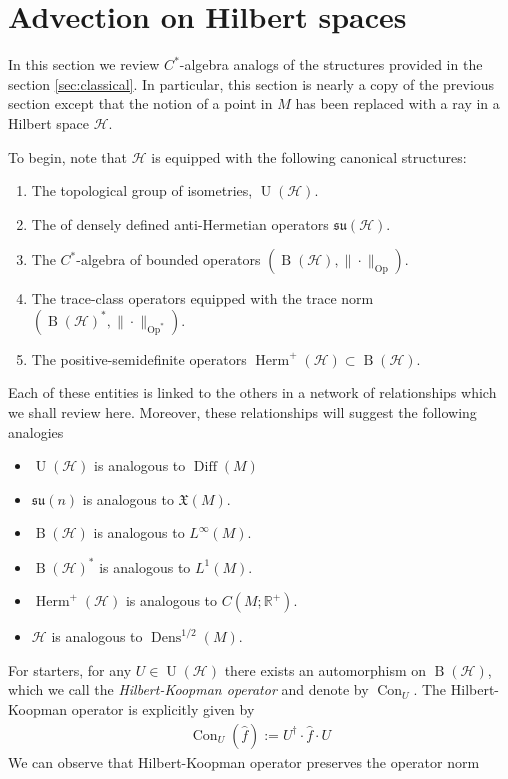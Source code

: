 \documentclass[12pt]{amsart}
\newcommand{\R}{\ensuremath{\mathbb{R}}}
\renewcommand{\H}{\ensuremath{\mathcal{H}}}
\DeclareMathOperator{\Diff}{Diff}
\DeclareMathOperator{\Dens}{Dens}
\DeclareMathOperator{\U}{U}
\DeclareMathOperator{\B}{B}
\DeclareMathOperator{\Herm}{Herm}
\DeclareMathOperator{\Op}{Op}
\DeclareMathOperator{\Con}{Con}
\begin{document}
\section{Advection on Hilbert spaces}
\label{sec:Hilbert}
In this section we review $C^*$-algebra analogs of the structures provided in the section \ref{sec:classical}.
In particular, this section is nearly a copy of the previous section except that the notion of a point in $M$ has been replaced with a ray in a Hilbert space $\mathcal{H}$.

To begin, note that $\H$ is equipped with the following canonical structures:
\begin{enumerate}
	\item The topological group of isometries, $\U(\H)$.
	\item The of densely defined anti-Hermetian operators $\mathfrak{su}(\H)$.
	\item The $C^*$-algebra of bounded operators $( \B(\H) , \| \cdot \|_{\Op})$.
	\item The trace-class operators equipped with the trace norm $(\B(\H)^*,\| \cdot \|_{\Op^*})$.
	\item The positive-semidefinite operators $\Herm^+(\H) \subset \B(\H)$.
\end{enumerate}
Each of these entities is linked to the others in a network of relationships
which we shall review here.
Moreover, these relationships will suggest the following analogies
\begin{itemize}
	\item $\U(\H)$ is analogous to $\Diff(M)$
	\item $\mathfrak{su}(n)$ is analogous to $\mathfrak{X}(M)$.
	\item $\B(\H)$ is analogous to $L^\infty(M)$.
	\item $\B(\H)^*$ is analogous to $L^1(M)$.
	\item $\Herm^+(\H)$ is analogous to $C(M;\R^+)$.
	\item $\H$ is analogous to $\Dens^{1/2}(M)$.
\end{itemize}
For starters, for any $U \in \U(\H)$ there exists an automorphism on $\B(\H)$, which we call the \emph{Hilbert-Koopman operator} and denote by $\Con_U$.
The Hilbert-Koopman operator is explicitly given by
\begin{align*}
	\Con_U( \hat{f} ) := U^\dagger \cdot \hat{f} \cdot U
\end{align*}
We can observe that Hilbert-Koopman operator preserves the operator norm
\end{document}
